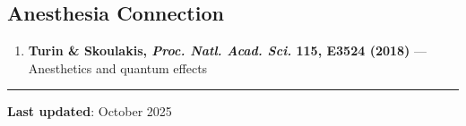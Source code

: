 \subsection{Anesthesia Connection}\label{anesthesia-connection}

\begin{enumerate}
\def\labelenumi{\arabic{enumi}.}
\setcounter{enumi}{8}
\tightlist
\item
  \textbf{Turin \& Skoulakis, \emph{Proc. Natl. Acad. Sci.} 115, E3524
  (2018)} --- Anesthetics and quantum effects
\end{enumerate}

\begin{center}\rule{0.5\linewidth}{0.5pt}\end{center}

\textbf{Last updated}: October 2025
